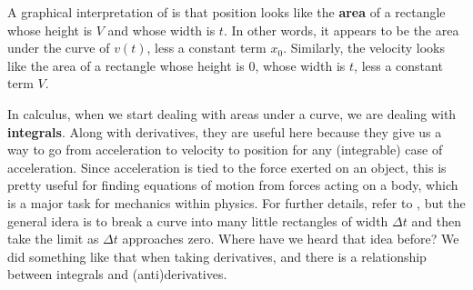 \documentclass{tufte-handout}
\begin{document}
A graphical interpretation of  is that position looks like the \textbf{area} of a rectangle whose height is $V$ and whose width is $t$. In other words, it appears to be the area under the curve of $v(t)$, less a constant term $x_0$. Similarly, the velocity looks like the area of a rectangle whose height is $0$, whose width is $t$, less a constant term $V$. 

In calculus, when we start dealing with areas under a curve, we are dealing with \textbf{integrals}\cite{greenspan1987calculus, kreysig2015advanced}. Along with derivatives, they are useful here because they give us a way to go from acceleration to velocity to position for any (integrable) case of acceleration. Since acceleration is tied to the force exerted on an object, this is pretty useful for finding equations of motion from forces acting on a body, which is a major task for mechanics within physics. For further details, refer to \cite{greenspan1987calculus}, but the general idera is to break a curve into many little rectangles of width $\Delta t$ and then take the limit as $\Delta t$ approaches zero. Where have we heard that idea before? We did something like that when taking derivatives, and there is a relationship between integrals and (anti)derivatives. 
\end{document}
